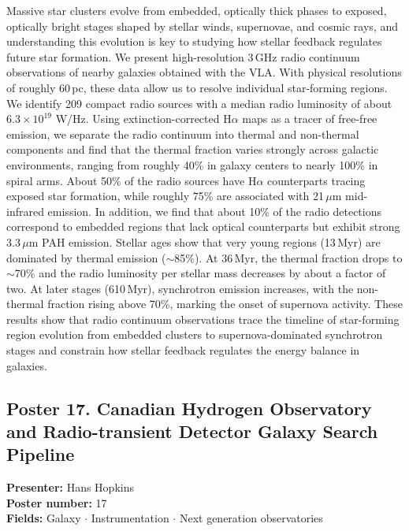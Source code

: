 Massive star clusters evolve from embedded, optically thick phases to exposed, optically bright stages shaped by stellar winds, supernovae, and cosmic rays, and understanding this evolution is key to studying how stellar feedback regulates future star formation. We present high-resolution 3\,GHz radio continuum observations of nearby galaxies obtained with the VLA. With physical resolutions of roughly 60\,pc, these data allow us to resolve individual star-forming regions. We identify 209 compact radio sources with a median radio luminosity of about $6.3 \times 10^{19}$ W/Hz. Using extinction-corrected H$\alpha$ maps as a tracer of free-free emission, we separate the radio continuum into thermal and non-thermal components and find that the thermal fraction varies strongly across galactic environments, ranging from roughly 40\% in galaxy centers to nearly 100\% in spiral arms. About 50\% of the radio sources have H$\alpha$ counterparts tracing exposed star formation, while roughly 75\% are associated with 21\,$\mu$m mid-infrared emission. In addition, we find that about 10\% of the radio detections correspond to embedded regions that lack optical counterparts but exhibit strong 3.3\,$\mu$m PAH emission. Stellar ages show that very young regions (13\,Myr) are dominated by thermal emission ($\sim$85\%). At 36\,Myr, the thermal fraction drops to $\sim$70\% and the radio luminosity per stellar mass decreases by about a factor of two. At later stages (610\,Myr), synchrotron emission increases, with the non-thermal fraction rising above 70\%, marking the onset of supernova activity. These results show that radio continuum observations trace the timeline of star-forming region evolution from embedded clusters to supernova-dominated synchrotron stages and constrain how stellar feedback regulates the energy balance in galaxies.

\hypertarget{poster-abstract-talk-40}{}\label{poster-abstract-page-talk-40}
\subsection*{Poster 17. Canadian Hydrogen Observatory and Radio-transient Detector Galaxy Search Pipeline}
\textbf{Presenter:} Hans Hopkins\\
\textbf{Poster number:} 17\\
\textbf{Fields:} Galaxy $\cdot$ Instrumentation $\cdot$ Next generation observatories

